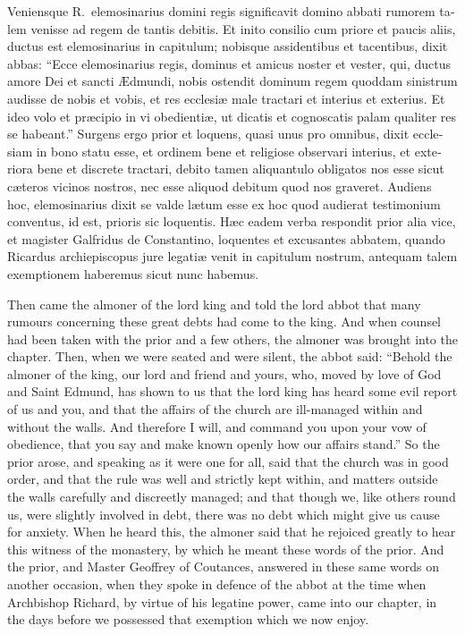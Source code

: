 \documentclass{book}
\begin{document}
\begin{paracol}{2}
\begin{otherlanguage}{latin}
Veniensque R.\ elemosinarius domini regis significavit domino abbati rumorem talem venisse ad regem de tantis debitis. Et inito consilio cum priore et paucis aliis, ductus est elemosinarius in capitulum; nobisque assidentibus et tacentibus, dixit abbas: ``Ecce elemosinarius regis, dominus et amicus noster et vester, qui, ductus amore Dei et sancti \AE{}dmundi, nobis ostendit dominum regem quoddam sinistrum audisse de nobis et vobis, et res ecclesi\ae{} male tractari et interius et exterius. Et ideo volo et pr\ae{}cipio in vi obedienti\ae{}, ut dicatis et cognoscatis palam qualiter res se habeant.'' Surgens ergo prior et loquens, quasi unus pro omnibus, dixit ecclesiam in bono statu esse, et ordinem bene et religiose observari interius, et exteriora bene et discrete tractari, debito tamen aliquantulo obligatos nos esse sicut c\ae{}teros vicinos nostros, nec esse aliquod debitum quod nos graveret. Audiens hoc, elemosinarius dixit se valde l\ae{}tum esse ex hoc quod audierat testimonium conventus, id est, prioris sic loquentis. H\ae{}c eadem verba respondit prior alia vice, et magister Galfridus de Constantino, loquentes et excusantes abbatem, quando Ricardus archiepiscopus jure legati\ae{} venit in capitulum nostrum, antequam talem exemptionem haberemus sicut nunc habemus.
\end{otherlanguage}

\switchcolumn

Then came the almoner of the lord king and told the lord abbot that many rumours concerning these great debts had come to the king. And when counsel had been taken with the prior and a few others, the almoner was brought into the chapter. Then, when we were seated and were silent, the abbot said: ``Behold the almoner of the king, our lord and friend and yours, who, moved by love of God and Saint Edmund, has shown to us that the lord king has heard some evil report of us and you, and that the affairs of the church are ill-­managed within and without the walls. And therefore I will, and command you upon your vow of obedience, that you say and make known openly how our affairs stand.'' So the prior arose, and speaking as it were one for all, said that the church was in good order, and that the rule was well and strictly kept within, and matters outside the walls carefully and discreetly managed; and that though we, like others round us, were slightly involved in debt, there was no debt which might give us cause for anxiety. When he heard this, the almoner said that he rejoiced greatly to hear this witness of the monastery, by which he meant these words of the prior. And the prior, and Master Geoffrey of Coutances, answered in these same words on another occasion, when they spoke in defence of the abbot at the time when Archbishop Richard, by virtue of his legatine power, came into our chapter, in the days before we possessed that exemption which we now enjoy.


\end{paracol}
\end{document}
